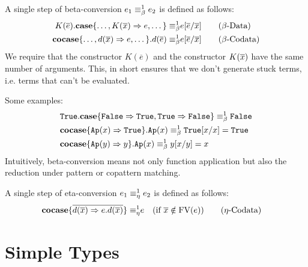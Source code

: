 \documentclass[twoside,12pt,a4paper]{article}
\begin{document}
\begin{definition}
    A single step of beta-conversion $e_1 \equiv_{\beta}^1 e_2$ is defined as follows:
    \begin{align*}
        K(\overline{e}).\textbf{case}\{\dots,K(\overline{x})\Rightarrow e,\dots\} 
        \equiv_{\beta}^1 & e[\overline{e}/\overline{x}] \tag{$\beta$-Data}\\
        \textbf{cocase}\{\dots,d(\overline{x}) \Rightarrow e, \dots\}.d(\overline{e})
        \equiv_{\beta}^1 & e[\overline{e}/\overline{x}]  \tag{$\beta$-Codata}
    \end{align*}
    We require that the constructor $K(\overline{e})$ and the constructor $K(\overline{x})$ have the same number of arguments.
    This, in short ensures that we don't generate stuck terms, i.e. terms that can't be evaluated. %
\end{definition}
Some examples:
\begin{align*}
    &\mathtt{True}.\textbf{case}\{\mathtt{False}\Rightarrow \mathtt{True}, \mathtt{True} \Rightarrow \mathtt{False}\}\equiv_{\beta}^1\mathtt{False}\\
    &\textbf{cocase}\{\texttt{Ap}(x)\Rightarrow \mathtt{True}\}.\texttt{Ap}(x)\equiv_{\beta}^1 \mathtt{True}[x/x] = \mathtt{True} \\
    &\textbf{cocase}\{\texttt{Ap}(y)\Rightarrow y\}.\texttt{Ap}(x) \equiv_{\beta}^1 y[x/y]= x
\end{align*}
Intuitively, beta-conversion means not only function application but also the reduction under pattern or copattern matching. %

\begin{definition}
    A single step of eta-conversion $e_1 \equiv_{\eta}^1 e_2$ is defined as follows:
    \begin{align*}
        \textbf{cocase}\{\overline{d(\overline{x})\Rightarrow e.d(\overline{x})}\}
        \equiv_{\eta}^1 & e \quad (\text{if } \overline{x}\notin \text{FV}(e)) \tag{$\eta$-Codata}
    \end{align*}
\end{definition}

\section{Simple Types}
\end{document}
